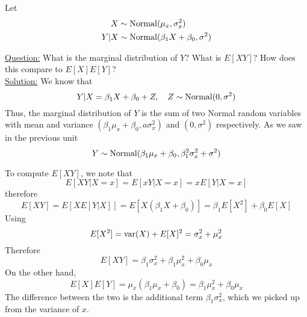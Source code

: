  
 \begin{example}\label{ex:firstreg}
Let
\begin{align*}
X &\sim {\rm Normal}(\mu_x,\sigma_x^2)\\
Y|X &\sim {\rm Normal}(\beta_1X + \beta_0,\sigma^2)
\end{align*}

 \noindent
\underline{Question:} What is the marginal distribution of $Y$? What is $E[XY]$? How does this compare to $E[X]E[Y]$?\\


 \noindent
\underline{Solution:} We know that 
\begin{equation*}
Y|X =\beta_1X+\beta_0 + Z,\quad Z \sim {\rm Normal}(0,\sigma^2)
\end{equation*}
Thus, the marginal distribution of $Y$ is the sum of two Normal random variables with mean and variance $(\beta_1\mu_x+\beta_0,a\sigma_x^2)$ and $(0,\sigma^2)$ respectively. As we saw in the previous unit
\begin{equation*}
Y  \sim {\rm Normal}(\beta_1\mu_x+\beta_0,\beta_1^2\sigma_x^2 + \sigma^2)
\end{equation*}

To compute $E[XY]$, we note that 
\begin{equation*}
E[XY|X=x]=  E[xY|X=x]= xE[Y|X=x]
\end{equation*}
therefore
\begin{equation*}
E[XY] = E[XE[Y|X]] = E[X(\beta_1X+\beta_0)] = \beta_1E[X^2]+\beta_0E[X]
\end{equation*}
Using 
\begin{equation*}
E[X^2] = {\rm var}(X) + E[X]^2 = \sigma_x^2 + \mu_x^2
\end{equation*}
Therefore 
\begin{equation*}
E[XY] =  \beta_1\sigma_x^2 + \beta_1\mu_x^2 + \beta_0\mu_x
\end{equation*}
On the other hand, 
\begin{equation*}
E[X]E[Y] = \mu_x(\beta_1\mu_x+\beta_0) = \beta_1 \mu_x^2 +\beta_0 \mu_x
\end{equation*}
The difference between the two is the additional term $\beta_1\sigma_x^2$, which we picked up from the variance of $x$.  





\end{example}

\appendix

